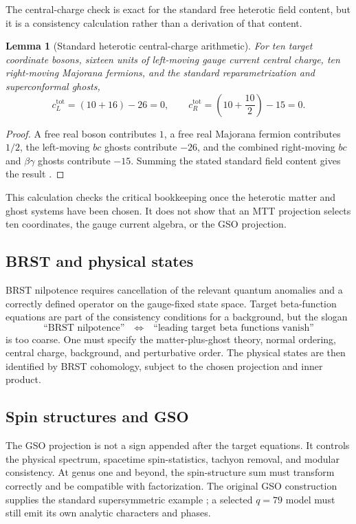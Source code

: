 \documentclass[11pt]{article}
\newtheorem{lemma}[theorem]{Lemma}
\theoremstyle{definition}
\theoremstyle{remark}
\begin{document}
The central-charge check is exact for the standard free heterotic field
content, but it is a consistency calculation rather than a derivation of that
content.

\begin{lemma}[Standard heterotic central-charge arithmetic]
\label{lem:central-charge}
For ten target coordinate bosons, sixteen units of left-moving gauge current
central charge, ten right-moving Majorana fermions, and the standard
reparametrization and superconformal ghosts,
\[
c_L^{\mathrm{tot}}=(10+16)-26=0,\qquad
c_R^{\mathrm{tot}}=\left(10+\frac{10}{2}\right)-15=0.
\]
\end{lemma}

\begin{proof}
A free real boson contributes \(1\), a free real Majorana fermion contributes
\(1/2\), the left-moving \(bc\) ghosts contribute \(-26\), and the combined
right-moving \(bc\) and \(\beta\gamma\) ghosts contribute \(-15\).  Summing
the stated standard field content gives the result
\cite{GSW1987,Polchinski1998}.
\end{proof}

This calculation checks the critical bookkeeping once the heterotic matter
and ghost systems have been chosen.  It does not show that an MTT projection
selects ten coordinates, the gauge current algebra, or the GSO projection.

\subsection{BRST and physical states}

BRST nilpotence requires cancellation of the relevant quantum anomalies and
a correctly defined operator on the gauge-fixed state space.  Target
beta-function equations are part of the consistency conditions for a
background, but the slogan
\[
\text{``BRST nilpotence''}\quad\Longleftrightarrow\quad\text{``leading
target beta functions vanish''}
\]
is too coarse.  One must specify the matter-plus-ghost theory, normal
ordering, central charge, background, and perturbative order.  The physical
states are then identified by BRST cohomology, subject to the chosen
projection and inner product.

\subsection{Spin structures and GSO}

The GSO projection is not a sign appended after the target equations.  It
controls the physical spectrum, spacetime spin-statistics, tachyon removal,
and modular consistency.  At genus one and beyond, the spin-structure sum
must transform correctly and be compatible with factorization.  The original
GSO construction supplies the standard supersymmetric example
\cite{GSO1976}; a selected \(q=79\) model must still emit its own analytic
characters and phases.
\end{document}
